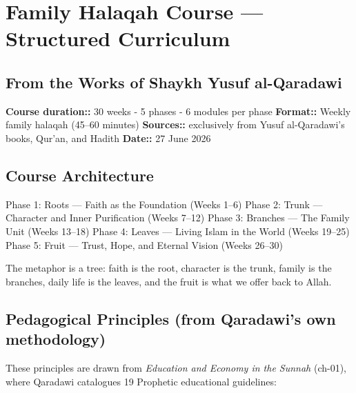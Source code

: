 \documentclass[11pt,a4paper]{article}
\begin{document}
\section*{Family Halaqah Course --- Structured Curriculum}

\subsection*{From the Works of Shaykh Yusuf al-Qaradawi}

\textbf{Course duration::} 30 weeks - 5 phases - 6 modules per phase
\textbf{Format::} Weekly family halaqah (45–60 minutes)
\textbf{Sources::} exclusively from Yusuf al-Qaradawi's books, Qur'an, and Hadith
\textbf{Date::} 27 June 2026

\vspace{6pt}\noindent{\color{border}\rule{\textwidth}{0.5pt}}\vspace{6pt}

\subsection*{Course Architecture}

\begin{quotebox}
Phase 1: Roots --- Faith as the Foundation          (Weeks 1–6)
Phase 2: Trunk --- Character and Inner Purification  (Weeks 7–12)
Phase 3: Branches --- The Family Unit                (Weeks 13–18)
Phase 4: Leaves --- Living Islam in the World        (Weeks 19–25)
Phase 5: Fruit --- Trust, Hope, and Eternal Vision   (Weeks 26–30)
\end{quotebox}

The metaphor is a tree: faith is the root, character is the trunk, family is the branches, daily life is the leaves, and the fruit is what we offer back to Allah.

\vspace{6pt}\noindent{\color{border}\rule{\textwidth}{0.5pt}}\vspace{6pt}

\subsection*{Pedagogical Principles (from Qaradawi's own methodology)}

These principles are drawn from \textit{Education and Economy in the Sunnah} (ch-01), where Qaradawi catalogues 19 Prophetic educational guidelines:
\end{document}
